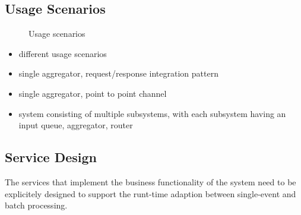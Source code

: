 \subsection{Usage Scenarios}
\begin{landscape}
	\begin{figure*}[htpb]
		\centering
		\mbox{}
		\mbox{}
		\caption{Usage scenarios}
	\end{figure*}
\end{landscape}

\begin{itemize}
	\item different usage scenarios
	\item single aggregator, request/response integration pattern
	\item single aggregator, point to point channel
	\item system consisting of multiple subsystems, with each subsystem having an input queue, aggregator, router
\end{itemize}

\subsection{Service Design}
\label{sec:ch05_service_design}

The services that implement the business functionality of the system need to be explicitely designed to support the runt-time adaption between single-event and batch processing. 

